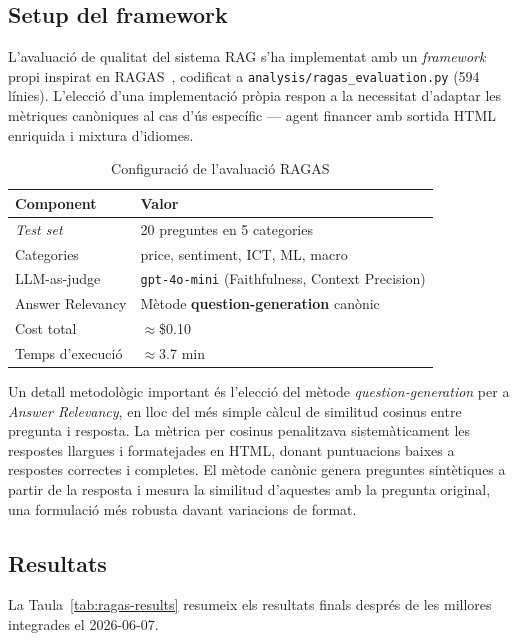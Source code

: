 \documentclass[12pt, a4paper]{report}
\begin{document}
\subsection{Setup del framework}

L'avaluació de qualitat del sistema RAG s'ha implementat amb un \emph{framework} propi inspirat en RAGAS~\cite{es2024}, codificat a \texttt{analysis/ragas\_evaluation.py} (594 línies). L'elecció d'una implementació pròpia respon a la necessitat d'adaptar les mètriques canòniques al cas d'ús específic --- agent financer amb sortida HTML enriquida i mixtura d'idiomes.

\begin{table}[H]
\centering
\caption{Configuració de l'avaluació RAGAS}
\label{tab:ragas-setup}
\begin{tabular}{@{}L{5cm}L{8cm}@{}}
\toprule
\textbf{Component} & \textbf{Valor} \\
\midrule
\textit{Test set}              & 20 preguntes en 5 categories \\
Categories                     & price, sentiment, ICT, ML, macro \\
LLM-as-judge                   & \texttt{gpt-4o-mini} (Faithfulness, Context Precision) \\
Answer Relevancy               & Mètode \textbf{question-generation} canònic \\
Cost total                     & $\approx$\$0.10 \\
Temps d'execució               & $\approx$3.7 min \\
\bottomrule
\end{tabular}
\end{table}

Un detall metodològic important és l'elecció del mètode \emph{question-generation} per a \textit{Answer Relevancy}, en lloc del més simple càlcul de similitud cosinus entre pregunta i resposta. La mètrica per cosinus penalitzava sistemàticament les respostes llargues i formatejades en HTML, donant puntuacions baixes a respostes correctes i completes. El mètode canònic genera preguntes sintètiques a partir de la resposta i mesura la similitud d'aquestes amb la pregunta original, una formulació més robusta davant variacions de format.

\subsection{Resultats}

La Taula~\ref{tab:ragas-results} resumeix els resultats finals després de les millores integrades el 2026-06-07.
\end{document}
